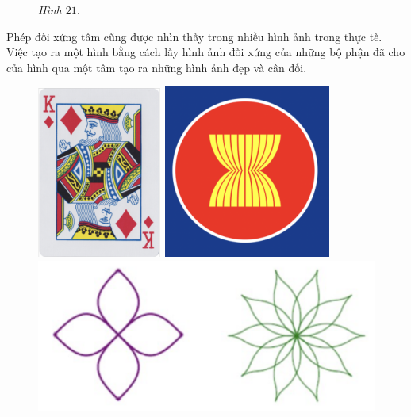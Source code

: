 \begin{multicols}{2}
\begin{figure}[H]
		\caption{\small\textit{\color{toancuabi}Hình $21$.}}
		\vspace*{-10pt}
	\end{figure}
	Phép đối xứng tâm cũng được nhìn thấy trong nhiều hình ảnh trong thực tế. Việc tạo ra một hình bằng cách lấy hình ảnh đối xứng của những bộ phận đã cho của hình qua một tâm tạo ra những hình ảnh đẹp và cân đối.
	\begin{figure}[H]
		\vspace*{-5pt}
		\centering
		\captionsetup{labelformat= empty, justification=centering}
		\includegraphics[height= 0.55\linewidth]{22a}
		\includegraphics[height= 0.55\linewidth]{22b}
		\includegraphics[width=\linewidth]{22c}

\end{figure}
\end{multicols}
